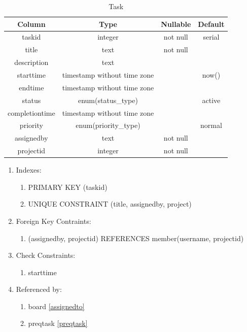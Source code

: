 \documentclass[conference]{IEEEtran}
\begin{document}
\begin{table}[htbp]
  \caption{Task}
  \begin{center}
    \begin{tabular}{|c|c|c|c|}
      \hline
      \textbf{Column} & \textbf{Type} & \textbf{Nullable} & \textbf{Default}\\
      \hline
      taskid & integer & not null & serial\\
      title & text & not null &\\
      description & text &&\\
      starttime & timestamp without time zone && now()\\
      endtime & timestamp without time zone &&\\
      status & enum(status\_type) && active\\
      completiontime & timestamp without time zone &&\\
      priority & enum(priority\_type) && normal\\
      assignedby & text & not null &\\
      projectid & integer & not null &\\
      \hline
    \end{tabular}
    \begin{enumerate}
    \item Indexes:
      \begin{enumerate}
      \item PRIMARY KEY (taskid)
      \item UNIQUE CONSTRAINT (title, assignedby, project)
      \end{enumerate}
    \item Foreign Key Contraints:
      \begin{enumerate}
        \item (assignedby, projectid) REFERENCES member(username, projectid)
      \end{enumerate}
    \item Check Constraints:
      \begin{enumerate}
      \item starttime
      \end{enumerate}
    \item Referenced by:
      \begin{enumerate}
      \item board \ref{assignedto}
      \item preqtask \ref{preqtask}
      \end{enumerate}

\end{enumerate}
\end{center}
\end{table}
\end{document}
